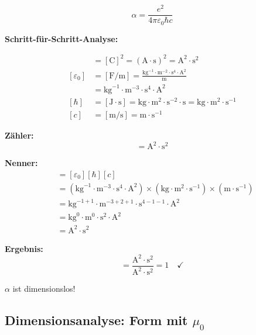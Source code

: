	\begin{equation}
		\alpha = \frac{e^2}{4\pi\varepsilon_0\hbar c}
	\end{equation}
	
	\textbf{Schritt-für-Schritt-Analyse:}
	
	\begin{align}
		[e^2] &= [\text{C}]^2 = (\text{A}\cdot\text{s})^2 = \text{A}^2\cdot\text{s}^2 \\
		[\varepsilon_0] &= [\text{F/m}] = \frac{\text{kg}^{-1}\cdot\text{m}^{-2}\cdot\text{s}^4\cdot\text{A}^2}{\text{m}} \\
		&= \text{kg}^{-1}\cdot\text{m}^{-3}\cdot\text{s}^4\cdot\text{A}^2 \\
		[\hbar] &= [\text{J}\cdot\text{s}] = \text{kg}\cdot\text{m}^2\cdot\text{s}^{-2}\cdot\text{s} = \text{kg}\cdot\text{m}^2\cdot\text{s}^{-1} \\
		[c] &= [\text{m/s}] = \text{m}\cdot\text{s}^{-1}
	\end{align}
	
	\textbf{Zähler:}
	\begin{equation}
		[e^2] = \text{A}^2\cdot\text{s}^2
	\end{equation}
	
	\textbf{Nenner:}
	\begin{align}
		[4\pi\varepsilon_0\hbar c] &= [\varepsilon_0][\hbar][c] \\
		&= (\text{kg}^{-1}\cdot\text{m}^{-3}\cdot\text{s}^4\cdot\text{A}^2) \times (\text{kg}\cdot\text{m}^2\cdot\text{s}^{-1}) \times (\text{m}\cdot\text{s}^{-1}) \\
		&= \text{kg}^{-1+1}\cdot\text{m}^{-3+2+1}\cdot\text{s}^{4-1-1}\cdot\text{A}^2 \\
		&= \text{kg}^0\cdot\text{m}^0\cdot\text{s}^2\cdot\text{A}^2 \\
		&= \text{A}^2\cdot\text{s}^2
	\end{align}
	
	\textbf{Ergebnis:}
	\begin{equation}
		[\alpha] = \frac{\text{A}^2\cdot\text{s}^2}{\text{A}^2\cdot\text{s}^2} = 1 \quad \checkmark
	\end{equation}
	
	$\alpha$ ist dimensionslos!
	
	\subsection[Dimensionsanalyse: Form mit mu0]{Dimensionsanalyse: Form mit $\mu_0$}
	
